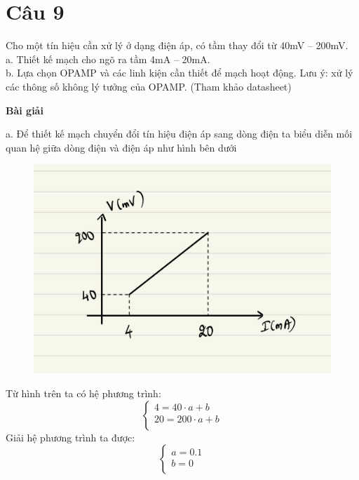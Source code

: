 \section{Câu 9}
Cho một tín hiệu cần xử lý ở dạng điện áp, có tầm thay đổi từ 40mV – 200mV.\\
a. Thiết kế mạch cho ngõ ra tầm 4mA – 20mA.\\
b. Lựa chọn OPAMP và các linh kiện cần thiết để mạch hoạt động. Lưu ý: xử lý các
thông số không lý tưởng của OPAMP. (Tham khảo datasheet)\\

\begin{center}
\textbf{Bài giải}
\end{center}

a. Để thiết kế mạch chuyển đổi tín hiệu điện áp sang dòng điện ta biểu diễn mối quan hệ giữa dòng điện và điện áp như hình bên dưới
\begin{figure}[H]
    \centering
    \includegraphics[scale=0.25]{image/C9_chart.png} 
\end{figure}
Từ hình trên ta có hệ phương trình:
\begin{equation*}
    \begin{cases}
        4 = 40\cdot a + b  \\
        20 = 200\cdot a + b\\
    \end{cases}
\end{equation*}
Giải hệ phương trình ta được:  
\begin{equation*}
    \begin{cases}
        a = 0.1 \\
        b = 0 \\
    \end{cases}
\end{equation*}
